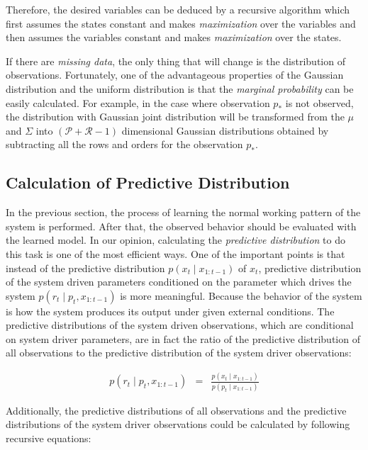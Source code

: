 Therefore, the desired variables can be deduced by a recursive algorithm which first assumes the states constant and makes \textit{maximization} over the variables and then assumes the variables constant and makes \textit{maximization} over the states.

If there are \textit{missing data}, the only thing that will change is the distribution of observations. Fortunately, one of the advantageous properties of the Gaussian distribution and the uniform distribution is that the \textit{marginal probability} can be easily calculated. For example, in the case where observation $p_*$ is not observed, the distribution with Gaussian joint distribution will be transformed from the $\mu$ and $\Sigma$ into $(\mathcal{P}+\mathcal{R}-1)$ dimensional Gaussian distributions obtained by subtracting all the rows and orders for the observation $p_*$.

\subsection{Calculation of Predictive Distribution}

In the previous section, the process of learning the normal working pattern of the system is performed. After that, the observed behavior should be evaluated with the learned model. In our opinion, calculating the \textit{predictive distribution} to do this task is one of the most efficient ways. One of the important points is that instead of the predictive distribution $p(x_t \mid x_{1:t-1})$ of $x_t$, predictive distribution of the system driven parameters conditioned on the parameter which drives the system $p(r_t \mid p_t, x_{1:t-1})$ is more meaningful. Because the behavior of the system is how the system produces its output under given external conditions.
The predictive distributions of the system driven observations, which are conditional on system driver parameters, are in fact the ratio of the predictive distribution of all observations to the predictive distribution of the system driver observations:

\begin{eqnarray}
p\left(r_t \mid p_t, x_{1:t-1}\right)
& = &  \frac{p\left(x_{t} \mid x_{1:t-1}\right)}{ p\left(p_t \mid x_{1:t-1}\right)}
\end{eqnarray}

Additionally, the predictive distributions of all observations and the predictive distributions of the system driver observations could be calculated by following recursive equations:

